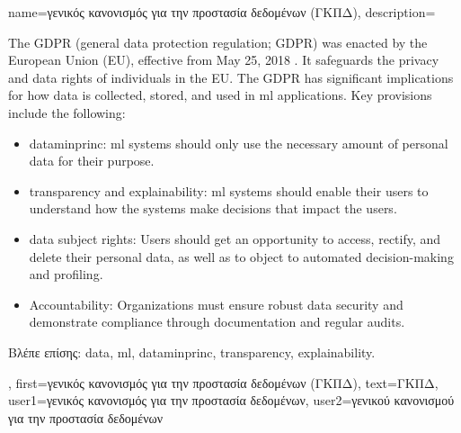 {name={\foreignlanguage{greek}{γενικός κανονισμός για την προστασία δεδομένων (ΓΚΠΔ)}},
	description={The GDPR (general data protection regulation; GDPR)
			was enacted by the European Union (EU), effective from May 25, 2018 \cite{GDPR2016}. 
			It safeguards the privacy and \gls{data} rights of individuals in the EU. 
			The GDPR has significant implications for how \gls{data} is collected, stored, and used in \gls{ml}  
			applications. Key provisions include the following:
			\begin{itemize}
				\item \Gls{dataminprinc}: \gls{ml} systems should only use the necessary amount of personal 
				\gls{data} for their purpose.
				\item \Gls{transparency} and \gls{explainability}: \gls{ml} systems should enable their users to 
				understand how the systems make decisions that impact the users.
				\item \Gls{data} subject rights: Users should get an opportunity to access, rectify, and delete their personal \gls{data}, as well as to object to 
				automated decision-making and profiling.
				\item Accountability: Organizations must ensure robust \gls{data} security and demonstrate 
				compliance through documentation and regular audits.
			\end{itemize}
			\foreignlanguage{greek}{Βλέπε επίσης:} \gls{data}, \gls{ml}, \gls{dataminprinc}, \gls{transparency}, \gls{explainability}.}, 
	first={\foreignlanguage{greek}{γενικός κανονισμός για την προστασία δεδομένων (ΓΚΠΔ)}},
	text={\foreignlanguage{greek}{ΓΚΠΔ}},
	user1={\foreignlanguage{greek}{γενικός κανονισμός για την προστασία δεδομένων}}, %
    	user2={\foreignlanguage{greek}{γενικού κανονισμού για την προστασία δεδομένων}} %
}


